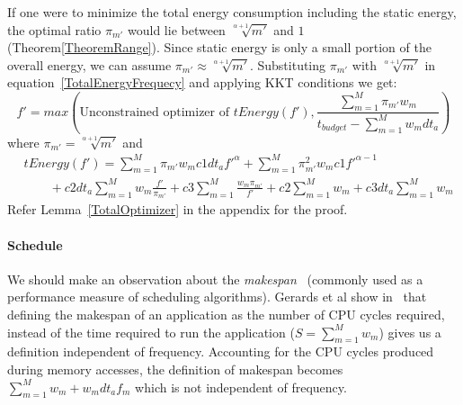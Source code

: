 \documentclass[11pt, letterpaper]{article}
\begin{document}
If one were to minimize the total energy consumption including the static energy, the optimal ratio $\pi_{m'}$ would lie between $\sqrt[\alpha+1]{m'}$ and $1$ (Theorem\ref{TheoremRange}). Since static energy is only a small portion of the overall energy, we can assume $\pi_{m'} \approx  \sqrt[\alpha+1]{m'}$. Substituting  $\pi_{m'}$ with $\sqrt[\alpha+1]{m'}$ in equation~\ref{TotalEnergyFrequecy} and applying KKT conditions we get:
\begin{displaymath}
f' = max(\text{Unconstrained optimizer of }  tEnergy(f'),  \frac{\sum_{m=1}^{M}\pi_{m'}w_m}{t_{budget} - \sum_{m=1}^{M}w_mdt_a})
\end{displaymath}
where $\pi_{m'} =\sqrt[\alpha+1]{m'}$ and \\
\begin{displaymath}
\begin{aligned}
 &tEnergy(f') = \sum_{m=1}^{M}\pi_{m'}w_m c1dt_af'^{\alpha} + \sum_{m=1}^{M}\pi_{m'}^2 w_m c1f'^{\alpha-1} \\
& \qquad + c2dt_a\sum_{m=1}^{M} w_m \frac{f'}{\pi_{m'}}  +  c3\sum_{m=1}^{M}\frac{w_m\pi_{m'}}{f'}  + c2\sum_{m=1}^{M}w_m + c3dt_a\sum_{m=1}^{M}w_m
 \end{aligned}
 \end{displaymath}
 Refer Lemma~\ref{TotalOptimizer} in the appendix for the proof.
 
\paragraph{Schedule}
We should make an observation about the \emph{makespan}~\cite{Brucker} (commonly used as a performance measure of scheduling algorithms). Gerards et al show in~\cite{ConvexAndScheduling} that defining the makespan of an application as the number of CPU cycles required, instead of the time required to run the application ($S = \sum_{m=1}^{M}w_m$)  gives us a definition independent of frequency. Accounting for the CPU cycles produced during memory accesses, the definition of makespan becomes $\sum_{m=1}^{M}w_m + w_mdt_af_m$ which is not independent of frequency.
\end{document}

